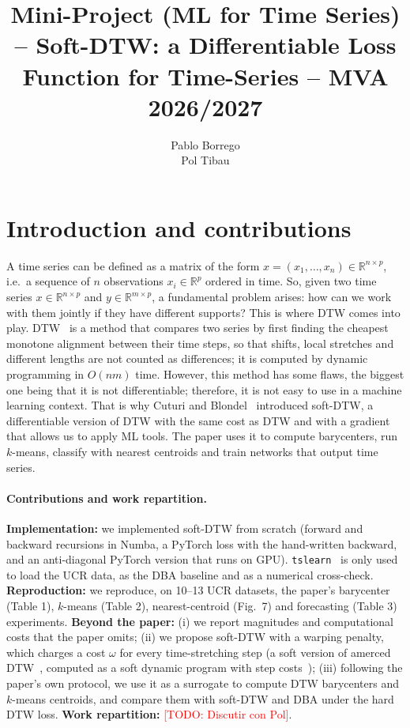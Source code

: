 \documentclass[11pt]{article}
\title{Mini-Project (ML for Time Series) -- Soft-DTW: a Differentiable Loss Function for Time-Series -- MVA 2026/2027}
\author{Pablo Borrego \email{pabloalmendralejo@gmail.com} \\ Pol Tibau \email{tibaurubaupol@gmail.com}}
\date{}
\newcommand{\todo}[1]{\textcolor{red}{[TODO: #1]}}
\providecommand{\R}{\mathbb{R}}
\begin{document}
\maketitle
\vspace{-1.5em}

\section{Introduction and contributions}


A time series can be defined as a matrix of the form $x=(x_1,\dots,x_n)\in\R^{n\times p}$, i.e.\ a sequence of $n$ observations $x_i\in\R^p$ ordered in time. So, given two time series $x\in\R^{n\times p}$ and $y\in\R^{m\times p}$, a fundamental problem arises: how can we work with them jointly if they have different supports? This is where DTW comes into play. DTW~\cite{sakoe1978dynamic} is a method that compares two series by first finding the cheapest monotone alignment between their time steps, so that shifts, local stretches and different lengths are not counted as differences; it is computed by dynamic programming in $O(nm)$ time. However, this method has some flaws, the biggest one being that it is not differentiable; therefore, it is not easy to use in a machine learning context. That is why Cuturi and Blondel~\cite{cuturi2017soft} introduced soft-DTW, a differentiable version of DTW with the same cost as DTW and with a gradient that allows us to apply ML tools. The paper uses it to compute barycenters, run $k$-means, classify with nearest centroids and train networks that output time series. 


\paragraph{Contributions and work repartition.}
\textbf{Implementation:} we implemented soft-DTW from scratch (forward and backward recursions in Numba, a PyTorch loss with the hand-written backward, and an anti-diagonal PyTorch version that runs on GPU). \texttt{tslearn}~\cite{tavenard2020tslearn} is only used to load the UCR data, as the DBA baseline and as a numerical cross-check.
\textbf{Reproduction:} we reproduce, on 10--13 UCR datasets, the paper's barycenter (Table 1), $k$-means (Table 2), nearest-centroid (Fig.~7) and forecasting (Table 3) experiments.
\textbf{Beyond the paper:} (i) we report magnitudes and computational costs that the paper omits; (ii) we propose soft-DTW with a warping penalty, which charges a cost $\omega$ for every time-stretching step (a soft version of amerced DTW~\cite{herrmann2023amercing}, computed as a soft dynamic program with step costs~\cite{mensch2018differentiable}); (iii) following the paper's own protocol, we use it as a surrogate to compute DTW barycenters and $k$-means centroids, and compare them with soft-DTW and DBA under the hard DTW loss.
\textbf{Work repartition:} \todo{Discutir con Pol}.
\end{document}

